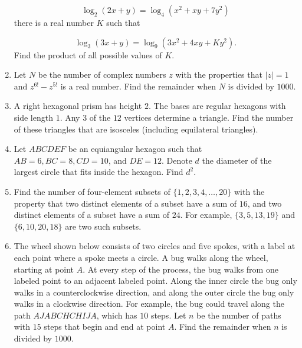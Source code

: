 \documentclass{article}
\begin{document}
\begin{enumerate}[label=\arabic*., itemsep=0.5em]
\begin{equation*}
\log_2(2x+y) = \log_4(x^2+xy+7y^2)
\end{equation*}
there is a real number $K$ such that

\begin{equation*}
\log_3(3x+y) = \log_9(3x^2+4xy+Ky^2).
\end{equation*}
Find the product of all possible values of $K$.\par \vspace{0.5em}\item Let $N$ be the number of complex numbers $z$ with the properties that $|z|=1$ and $z^{6!}-z^{5!}$ is a real number. Find the remainder when $N$ is divided by $1000$.\par \vspace{0.5em}\item A right hexagonal prism has height $2$. The bases are regular hexagons with side length $1$. Any $3$ of the $12$ vertices determine a triangle. Find the number of these triangles that are isosceles (including equilateral triangles).\par \vspace{0.5em}\item Let $ABCDEF$ be an equiangular hexagon such that $AB=6, BC=8, CD=10$, and $DE=12$. Denote $d$ the diameter of the largest circle that fits inside the hexagon. Find $d^2$.\par \vspace{0.5em}\item Find the number of four-element subsets of $\{1,2,3,4,\dots, 20\}$ with the property that two distinct elements of a subset have a sum of $16$, and two distinct elements of a subset have a sum of $24$. For example, $\{3,5,13,19\}$ and $\{6,10,20,18\}$ are two such subsets.\par \vspace{0.5em}\item The wheel shown below consists of two circles and five spokes, with a label at each point where a spoke meets a circle. A bug walks along the wheel, starting at point $A$. At every step of the process, the bug walks from one labeled point to an adjacent labeled point. Along the inner circle the bug only walks in a counterclockwise direction, and along the outer circle the bug only walks in a clockwise direction. For example, the bug could travel along the path $AJABCHCHIJA$, which has $10$ steps. Let $n$ be the number of paths with $15$ steps that begin and end at point $A.$ Find the remainder when $n$ is divided by $1000$.



\end{enumerate}
\end{document}
